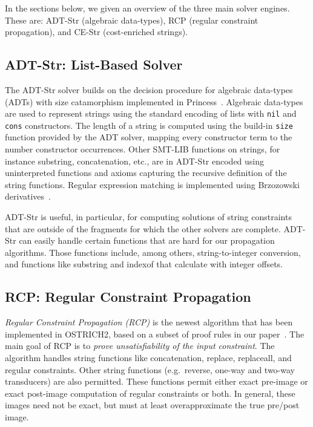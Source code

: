 In the sections below, we given an overview of the three main solver engines.
These are: ADT-Str (algebraic data-types), RCP (regular constraint propagation), and CE-Str (cost-enriched strings).

\subsection{ADT-Str: List-Based Solver}

The ADT-Str solver builds on the decision procedure for algebraic data-types (ADTs) with size catamorphism implemented in Princess~\cite{DBLP:conf/synasc/HojjatR17}.
Algebraic data-types are used to represent strings using the standard encoding of lists with \texttt{nil} and \texttt{cons} constructors.
The length of a string is computed using the build-in \texttt{size} function provided by the ADT solver, mapping every constructor term to the number constructor occurrences.
Other SMT-LIB functions on strings, for instance substring, concatenation, etc., are in ADT-Str encoded using uninterpreted functions and axioms capturing the recursive
definition of the string functions.
Regular expression matching is implemented using Brzozowski derivatives~\cite{Brzozowski}.

ADT-Str is  useful, in particular, for computing solutions of string
constraints that are outside of the fragments for which the other
solvers are complete.
ADT-Str can easily handle certain functions that are hard for our propagation algorithms.
Those functions include, among others, string-to-integer conversion, and functions like substring and indexof that calculate with integer offsets.

\subsection{RCP: Regular Constraint Propagation}

\emph{Regular Constraint Propagation (RCP)} is the newest algorithm that has been implemented in OSTRICH2, based on a subset of proof rules in our paper~\cite{popl22}.
The main goal of RCP is to \emph{prove unsatisfiability of the input constraint}.
The algorithm handles string functions like concatenation, replace, replaceall, and regular constraints.
Other string functions (e.g.\ reverse, one-way and two-way transducers) are also permitted.
These functions permit either exact pre-image or exact post-image computation of regular constraints or both.
In general, these images need not be exact, but must at least overapproximate the true pre/post image.

